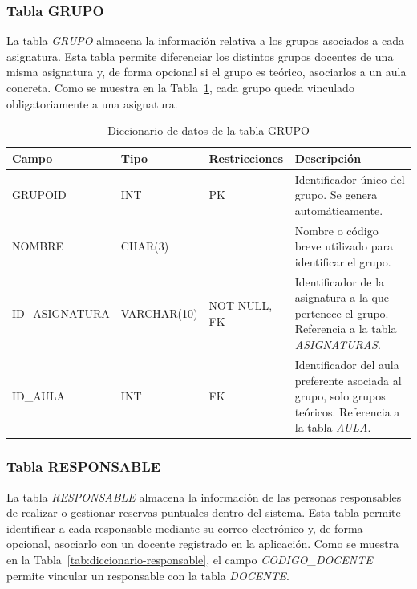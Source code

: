 \subsubsection{Tabla GRUPO}

 La tabla \textit{GRUPO} almacena la información relativa a los grupos asociados a cada asignatura. Esta tabla permite diferenciar los distintos grupos docentes de una misma asignatura y, de forma opcional si el grupo es teórico, asociarlos a un aula concreta. Como se muestra en la Tabla~\ref{tab:diccionario-grupo}, cada grupo queda vinculado obligatoriamente a una asignatura.\\

\begin{table}[H]
	\centering
	\scriptsize
	\setlength{\tabcolsep}{3pt}
	\renewcommand{\arraystretch}{1.15}
	\begin{tabularx}{\textwidth}{@{}
			>{\raggedright\arraybackslash}p{2.6cm}
			>{\raggedright\arraybackslash}p{2.2cm}
			>{\raggedright\arraybackslash}p{2.2cm}
			X@{}}
		\toprule
		\textbf{Campo} & \textbf{Tipo} & \textbf{Restricciones} & \textbf{Descripción} \\
		\midrule
		GRUPOID & INT & PK & Identificador único del grupo. Se genera automáticamente. \\
		NOMBRE & CHAR(3) &  & Nombre o código breve utilizado para identificar el grupo. \\
		ID\_\newline ASIGNATURA & VARCHAR(10) & NOT NULL, FK & Identificador de la asignatura a la que pertenece el grupo. Referencia a la tabla \textit{ASIGNATURAS}. \\
		ID\_AULA & INT & FK & Identificador del aula preferente asociada al grupo, solo grupos teóricos. Referencia a la tabla \textit{AULA}. \\
		\bottomrule
	\end{tabularx}
	\caption{Diccionario de datos de la tabla GRUPO}
	\label{tab:diccionario-grupo}
\end{table}

\subsubsection{Tabla RESPONSABLE}

 La tabla \textit{RESPONSABLE} almacena la información de las personas responsables de realizar o gestionar reservas puntuales dentro del sistema. Esta tabla permite identificar a cada responsable mediante su correo electrónico y, de forma opcional, asociarlo con un docente registrado en la aplicación. Como se muestra en la Tabla~\ref{tab:diccionario-responsable}, el campo \textit{CODIGO\_DOCENTE} permite vincular un responsable con la tabla \textit{DOCENTE}.\\

